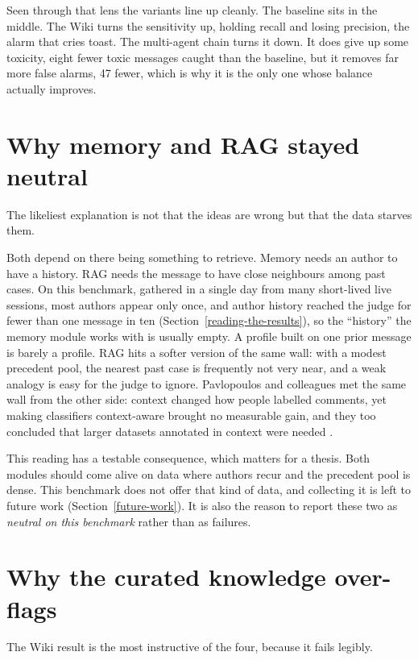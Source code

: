 Seen through that lens the variants line up cleanly. The baseline sits in the middle. The Wiki turns the sensitivity up, holding recall and losing precision, the alarm that cries toast. The multi-agent chain turns it down. It does give up some toxicity, eight fewer toxic messages caught than the baseline, but it removes far more false alarms, 47 fewer, which is why it is the only one whose balance actually improves.

\section{Why memory and RAG stayed neutral}\label{why-memory-and-rag-stayed-neutral}

The likeliest explanation is not that the ideas are wrong but that the data starves them.

Both depend on there being something to retrieve. Memory needs an author to have a history. RAG needs the message to have close neighbours among past cases. On this benchmark, gathered in a single day from many short-lived live sessions, most authors appear only once, and author history reached the judge for fewer than one message in ten (Section~\ref{reading-the-results}), so the ``history'' the memory module works with is usually empty. A profile built on one prior message is barely a profile. RAG hits a softer version of the same wall: with a modest precedent pool, the nearest past case is frequently not very near, and a weak analogy is easy for the judge to ignore. Pavlopoulos and colleagues met the same wall from the other side: context changed how people labelled comments, yet making classifiers context-aware brought no measurable gain, and they too concluded that larger datasets annotated in context were needed \citep{pavlopoulos2020context}.

This reading has a testable consequence, which matters for a thesis. Both modules should come alive on data where authors recur and the precedent pool is dense. This benchmark does not offer that kind of data, and collecting it is left to future work (Section~\ref{future-work}). It is also the reason to report these two as \emph{neutral on this benchmark} rather than as failures.

\section{Why the curated knowledge over-flags}\label{why-the-curated-knowledge-over-flags}

The Wiki result is the most instructive of the four, because it fails legibly.

